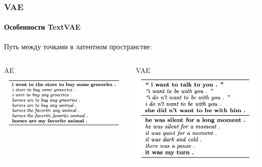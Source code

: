 \documentclass[10pt]{beamer}
\begin{document}
\begin{frame}
\frametitle{VAE}
\framesubtitle{Особенности TextVAE}

Путь между точками в латентном пространстве:
\begin{columns}[T]
    \begin{column}[T]{0.5\textwidth}
        \begin{center}
            AE \\
            \includegraphics[width=1\textwidth]{images/ae_path.png}
        \end{center}
    \end{column}
    \begin{column}[T]{0.5\textwidth}
        \begin{center}
            VAE \\
            \includegraphics[width=1\textwidth]{images/vae_path.png}
        \end{center}
    \end{column}
\end{columns}

\end{frame}
\end{document}
